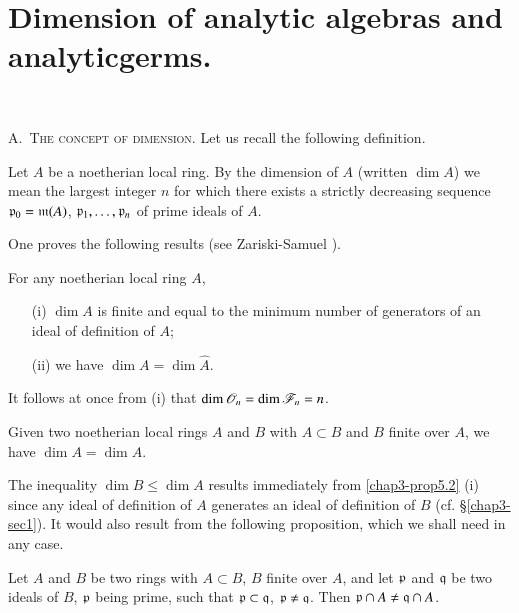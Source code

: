 \section[Dimension of analytic algebras and analytic germs.]{Dimension of analytic algebras and analytic\hfill\break germs.}\label{chap3-sec5}

~

A.~\textsc{The concept of dimension.} Let us recall the following definition.

\begin{definition}\label{chap3-defi5.1}
Let $A$ be a noetherian local ring. By the dimension of $A$ (written $\dim A$) we mean the largest integer $n$ for which there exists a strictly decreasing sequence $\mathfrak{p}_{0}=\mathfrak{m}(A)$, $\mathfrak{p}_{1},\ldots,\mathfrak{p}_{n}$ of prime ideals of $A$.
\end{definition}

One proves the following results (see Zariski-Samuel \cite{O. Zariski and P. Samuel : 1}).

\begin{proposition}\label{chap3-prop5.2}
For any noetherian local ring $A$,
\begin{itemize}
\item[(i)] $\dim A$ is finite and equal to the minimum number of generators of an ideal of definition of $A$;

\item[(ii)] we have $\dim A=\dim \widehat{A}$.
\end{itemize}

It follows at once from (i) that $\dim\mathscr{O}_{n}=\dim \mathscr{F}_{n}=n$.
\end{proposition}

\begin{theorem}\label{chap3-thm5.3}
Given two noetherian local rings $A$ and $B$ with $A\subset B$ and $B$ finite over $A$, we have $\dim A=\dim A$.
\end{theorem}

The inequality $\dim B\leq \dim A$ results immediately from \ref{chap3-prop5.2} (i) since any ideal of definition of $A$ generates an ideal of definition of $B$ (cf. \S\ref{chap3-sec1}). It would also result from the following proposition, which we shall need in any case.

\begin{proposition}\label{chap3-prop5.4}
Let $A$ and $B$ be two rings with $A\subset B$, $B$ finite over $A$, and let $\mathfrak{p}$ and $\mathfrak{q}$ be two ideals of $B$, $\mathfrak{p}$ being prime, such that $\mathfrak{p}\subset\mathfrak{q}$, $\mathfrak{p}\neq \mathfrak{q}$. Then $\mathfrak{p}\cap A\neq \mathfrak{q}\cap A$.
\end{proposition}

